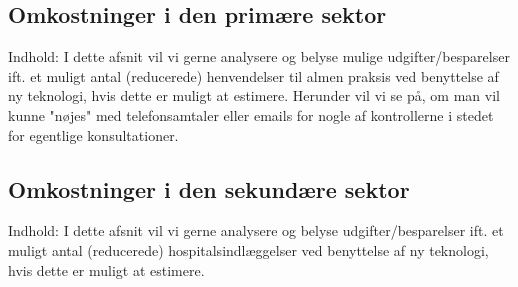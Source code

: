 \subsection{Omkostninger i den primære sektor}
Indhold: I dette afsnit vil vi gerne analysere og belyse mulige udgifter/besparelser ift. et muligt antal (reducerede) henvendelser til almen praksis ved benyttelse af ny teknologi, hvis dette er muligt at estimere. Herunder vil vi se på, om man vil kunne "nøjes" med telefonsamtaler eller emails for nogle af kontrollerne i stedet for egentlige konsultationer. 
\subsection{Omkostninger i den sekundære sektor}
Indhold: I dette afsnit vil vi gerne analysere og belyse udgifter/besparelser ift. et muligt antal (reducerede) hospitalsindlæggelser ved benyttelse af ny teknologi, hvis dette er muligt at estimere. 

